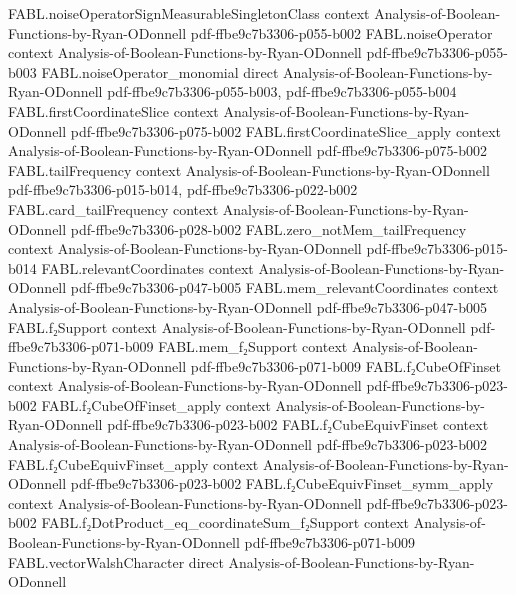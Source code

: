 \begin{theorem}
\proofstep
  {FABL.noiseOperatorSignMeasurableSingletonClass}
  {context}
  {Analysis-of-Boolean-Functions-by-Ryan-ODonnell}
  {pdf-ffbe9c7b3306-p055-b002}
\proofstep
  {FABL.noiseOperator}
  {context}
  {Analysis-of-Boolean-Functions-by-Ryan-ODonnell}
  {pdf-ffbe9c7b3306-p055-b003}
\proofstep
  {FABL.noiseOperator_monomial}
  {direct}
  {Analysis-of-Boolean-Functions-by-Ryan-ODonnell}
  {pdf-ffbe9c7b3306-p055-b003,
    pdf-ffbe9c7b3306-p055-b004}
\proofstep
  {FABL.firstCoordinateSlice}
  {context}
  {Analysis-of-Boolean-Functions-by-Ryan-ODonnell}
  {pdf-ffbe9c7b3306-p075-b002}
\proofstep
  {FABL.firstCoordinateSlice_apply}
  {context}
  {Analysis-of-Boolean-Functions-by-Ryan-ODonnell}
  {pdf-ffbe9c7b3306-p075-b002}
\proofstep
  {FABL.tailFrequency}
  {context}
  {Analysis-of-Boolean-Functions-by-Ryan-ODonnell}
  {pdf-ffbe9c7b3306-p015-b014,
    pdf-ffbe9c7b3306-p022-b002}
\proofstep
  {FABL.card_tailFrequency}
  {context}
  {Analysis-of-Boolean-Functions-by-Ryan-ODonnell}
  {pdf-ffbe9c7b3306-p028-b002}
\proofstep
  {FABL.zero_notMem_tailFrequency}
  {context}
  {Analysis-of-Boolean-Functions-by-Ryan-ODonnell}
  {pdf-ffbe9c7b3306-p015-b014}
\proofstep
  {FABL.relevantCoordinates}
  {context}
  {Analysis-of-Boolean-Functions-by-Ryan-ODonnell}
  {pdf-ffbe9c7b3306-p047-b005}
\proofstep
  {FABL.mem_relevantCoordinates}
  {context}
  {Analysis-of-Boolean-Functions-by-Ryan-ODonnell}
  {pdf-ffbe9c7b3306-p047-b005}
\proofstep
  {FABL.f₂Support}
  {context}
  {Analysis-of-Boolean-Functions-by-Ryan-ODonnell}
  {pdf-ffbe9c7b3306-p071-b009}
\proofstep
  {FABL.mem_f₂Support}
  {context}
  {Analysis-of-Boolean-Functions-by-Ryan-ODonnell}
  {pdf-ffbe9c7b3306-p071-b009}
\proofstep
  {FABL.f₂CubeOfFinset}
  {context}
  {Analysis-of-Boolean-Functions-by-Ryan-ODonnell}
  {pdf-ffbe9c7b3306-p023-b002}
\proofstep
  {FABL.f₂CubeOfFinset_apply}
  {context}
  {Analysis-of-Boolean-Functions-by-Ryan-ODonnell}
  {pdf-ffbe9c7b3306-p023-b002}
\proofstep
  {FABL.f₂CubeEquivFinset}
  {context}
  {Analysis-of-Boolean-Functions-by-Ryan-ODonnell}
  {pdf-ffbe9c7b3306-p023-b002}
\proofstep
  {FABL.f₂CubeEquivFinset_apply}
  {context}
  {Analysis-of-Boolean-Functions-by-Ryan-ODonnell}
  {pdf-ffbe9c7b3306-p023-b002}
\proofstep
  {FABL.f₂CubeEquivFinset_symm_apply}
  {context}
  {Analysis-of-Boolean-Functions-by-Ryan-ODonnell}
  {pdf-ffbe9c7b3306-p023-b002}
\proofstep
  {FABL.f₂DotProduct_eq_coordinateSum_f₂Support}
  {context}
  {Analysis-of-Boolean-Functions-by-Ryan-ODonnell}
  {pdf-ffbe9c7b3306-p071-b009}
\proofstep
  {FABL.vectorWalshCharacter}
  {direct}
  {Analysis-of-Boolean-Functions-by-Ryan-ODonnell}

\end{theorem}
